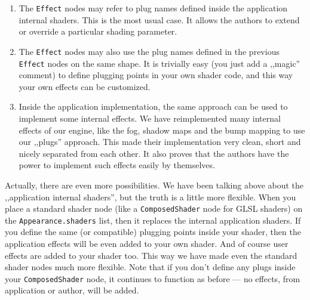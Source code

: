 \documentclass{egpubl}
\begin{document}
\begin{enumerate}

\item The \texttt{Effect} nodes may refer to plug names
defined inside the application internal shaders. This is the most usual case.
It allows the authors to extend or override a particular shading parameter.

\item The \texttt{Effect} nodes may also use the plug names defined
in the previous \texttt{Effect} nodes on the same shape.
It is trivially easy (you just add a ,,magic'' comment) to define
plugging points in your own shader code, and this way your own effects
can be customized.

\item Inside the application implementation, the same approach can be used
to implement some internal effects.
We have reimplemented many internal effects of our engine,
like the fog, shadow maps and the bump mapping to use our ,,plugs'' approach.
This made their implementation very clean, short
and nicely separated from each other. It also proves that
the authors have the power to implement such effects easily by themselves.



\end{enumerate}

Actually, there are even more possibilities.
We have been talking above about the ,,application internal shaders'',
but the truth is a little more flexible.
When you place a standard shader node
(like a \texttt{ComposedShader} node for GLSL shaders) on the
\texttt{Appearance.shaders} list,
then it replaces the internal application shaders.
If you define the same (or compatible) plugging points inside your shader,
then the application effects will be even added to your own
shader. And of course user effects are added to your shader too.
This way we have made even the standard shader nodes much more flexible.
Note that if you don't define any plugs inside your \texttt{ComposedShader} node,
it continues to function as before --- no effects, from application or author,
will be added.
\end{document}
